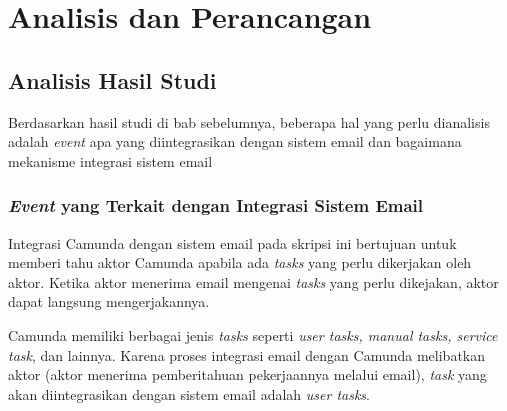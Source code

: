 \chapter{Analisis dan Perancangan}
\label{chap:analisisdanperancangan_hasilStudi}

\section{Analisis Hasil Studi}
\label{sec:analisisdanperancangan_hasilStudi}
Berdasarkan hasil studi di bab sebelumnya, beberapa hal yang perlu dianalisis adalah \textit{event} apa yang diintegrasikan dengan sistem email dan bagaimana mekanisme integrasi sistem email
\subsection{\textit{Event} yang Terkait dengan Integrasi Sistem Email}
\label{sec:eventUserTask}

Integrasi Camunda dengan sistem email pada skripsi ini bertujuan untuk memberi tahu aktor Camunda apabila ada \textit{tasks} yang perlu dikerjakan oleh aktor. Ketika aktor menerima email mengenai \textit{tasks} yang perlu dikejakan, aktor dapat langsung mengerjakannya. 

Camunda memiliki berbagai jenis \textit{tasks} seperti \textit{user tasks, manual tasks, service task}, dan lainnya. Karena proses integrasi email dengan Camunda melibatkan aktor (aktor menerima pemberitahuan pekerjaannya melalui email), \textit{task} yang akan diintegrasikan dengan sistem email adalah \textit{user tasks}.


